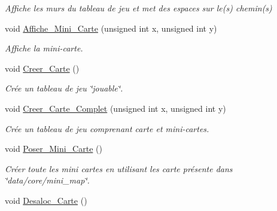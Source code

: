 \begin{DoxyCompactItemize}
\begin{DoxyCompactList}\small\item\em Affiche les murs du tableau de jeu et met des espaces sur le(s) chemin(s) \end{DoxyCompactList}\item 
\hypertarget{classCarte_a73d16df35abd20cb5241586ce25c26f9}{void \hyperlink{classCarte_a73d16df35abd20cb5241586ce25c26f9}{Affiche\+\_\+\+Mini\+\_\+\+Carte} (unsigned int x, unsigned int y)}\label{classCarte_a73d16df35abd20cb5241586ce25c26f9}

\begin{DoxyCompactList}\small\item\em Affiche la mini-\/carte. \end{DoxyCompactList}\item 
\hypertarget{classCarte_a21c2e51e7e370a865e8830ec8f9ec17d}{void \hyperlink{classCarte_a21c2e51e7e370a865e8830ec8f9ec17d}{Creer\+\_\+\+Carte} ()}\label{classCarte_a21c2e51e7e370a865e8830ec8f9ec17d}

\begin{DoxyCompactList}\small\item\em Crée un tableau de jeu \char`\"{}jouable\char`\"{}. \end{DoxyCompactList}\item 
\hypertarget{classCarte_aba841981d8fc6ce76fdd3cc8c088f2ef}{void \hyperlink{classCarte_aba841981d8fc6ce76fdd3cc8c088f2ef}{Creer\+\_\+\+Carte\+\_\+\+Complet} (unsigned int x, unsigned int y)}\label{classCarte_aba841981d8fc6ce76fdd3cc8c088f2ef}

\begin{DoxyCompactList}\small\item\em Crée un tableau de jeu comprenant carte et mini-\/cartes. \end{DoxyCompactList}\item 
\hypertarget{classCarte_ac2ec8c8b7eefae8d54f0154de0d3c7cc}{void \hyperlink{classCarte_ac2ec8c8b7eefae8d54f0154de0d3c7cc}{Poser\+\_\+\+Mini\+\_\+\+Carte} ()}\label{classCarte_ac2ec8c8b7eefae8d54f0154de0d3c7cc}

\begin{DoxyCompactList}\small\item\em Créer toute les mini cartes en utilisant les carte présente dans \char`\"{}data/core/mini\+\_\+map\char`\"{}. \end{DoxyCompactList}\item 
\hypertarget{classCarte_a1dcf09737c325add43b3cd28d6dcb3b2}{void \hyperlink{classCarte_a1dcf09737c325add43b3cd28d6dcb3b2}{Desaloc\+\_\+\+Carte} ()}\label{classCarte_a1dcf09737c325add43b3cd28d6dcb3b2}


\end{DoxyCompactItemize}
